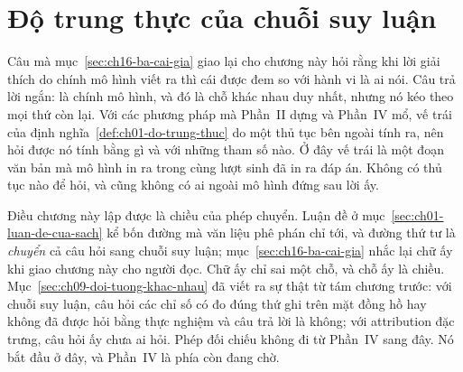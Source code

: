 %
%
\chapter{Độ trung thực của chuỗi suy luận}
\label{ch:do-trung-thuc-chuoi-suy-luan}

Câu mà mục~\ref{sec:ch16-ba-cai-gia} giao lại cho chương này hỏi rằng khi lời
giải thích do chính mô hình viết ra thì cái được đem so với hành vi là ai nói.
Câu trả lời ngắn: là chính mô hình, và đó là chỗ khác nhau duy nhất, nhưng nó
kéo theo mọi thứ còn lại. Với các phương pháp mà Phần~II dựng và Phần~IV mổ, vế
trái của định nghĩa~\ref{def:ch01-do-trung-thuc} do một thủ tục bên ngoài tính
ra, nên hỏi được nó tính bằng gì và với những tham số nào. Ở đây vế trái là một
đoạn văn bản mà mô hình in ra trong cùng lượt sinh đã in ra đáp án. Không có thủ
tục nào để hỏi, và cũng không có ai ngoài mô hình đứng sau lời ấy.

%
Điều chương này lập được là chiều của phép chuyển. Luận đề ở
mục~\ref{sec:ch01-luan-de-cua-sach} kể bốn đường mà văn liệu phê phán chỉ tới, và
đường thứ tư là \emph{chuyển} cả câu hỏi sang chuỗi suy luận;
mục~\ref{sec:ch16-ba-cai-gia} nhắc lại chữ ấy khi giao chương này cho người đọc.
Chữ ấy chỉ sai một chỗ, và chỗ ấy là chiều.
Mục~\ref{sec:ch09-doi-tuong-khac-nhau} đã viết ra sự thật từ tám chương trước:
với chuỗi suy luận, câu hỏi các chỉ
số có đo đúng thứ ghi trên mặt đồng hồ hay không đã được hỏi bằng thực nghiệm và
câu trả lời là không; với attribution đặc trưng, câu hỏi ấy chưa ai hỏi. Phép
đối chiếu không đi từ Phần~IV sang đây. Nó bắt đầu ở đây, và Phần~IV là phía
còn đang chờ.

